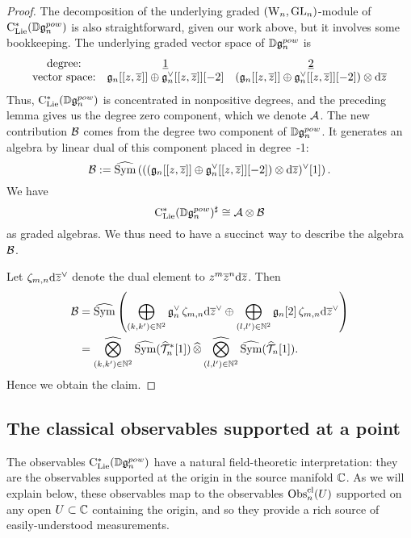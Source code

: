 \begin{proof}
The decomposition of the underlying graded $({{\rm W}_n},{\rm GL}_n)$-module of ${\rm C}_{\rm Lie}^*(\mathbb D\mathfrak{g}_n^{pow})$ 
is also straightforward, given our work above, but it involves some bookkeeping.
The underlying graded vector space of $\mathbb D\mathfrak{g}_n^{pow}$ is
\[
\begin{array}{ccc}
\text{degree:} & \underline{1} & \underline{2} \\
\text{vector space:} & \mathfrak{g}_n[[z,\overline{z}]] \oplus \mathfrak{g}_n^\vee[[z,\overline{z}]][-2] & (\mathfrak{g}_n[[z,\overline{z}]] \oplus \mathfrak{g}_n^\vee[[z,\overline{z}]][-2]) \otimes {\rm d}\overline{z}
\end{array}
\]
Thus, ${\rm C}_{\rm Lie}^*(\mathbb D\mathfrak{g}_n^{pow})$ is concentrated in nonpositive degrees, 
and the preceding lemma gives us the degree zero component,
which we denote $\mathcal{A}$.
The new contribution $\mathcal B$ comes from the degree two component of $\mathbb D\mathfrak{g}_n^{pow}$.
It generates an algebra by linear dual of this component placed in degree~-1:
\[
\mathcal B := \widehat{{\rm Sym}}\left( ((\mathfrak{g}_n[[z,\overline{z}]] \oplus \mathfrak{g}_n^\vee[[z,\overline{z}]][-2]) \otimes {\rm d}\overline{z})^\vee[1] \right).
\]
We  have
\[
{\rm C}_{\rm Lie}^*(\mathbb D\mathfrak{g}_n^{pow})^\sharp \cong \mathcal{A} \otimes \mathcal B
\]
as graded algebras.
We thus need to have a succinct way to describe the algebra~$\mathcal B$.

Let $\zeta_{m,n} {\rm d} \overline{z}^\vee$ denote the dual element to $z^m \overline{z}^n {\rm d}\overline{z}$.
Then 
\begin{align*}
\mathcal B &= \widehat{{\rm Sym}} \left( \bigoplus_{(k,k') \in \mathbb N^2} \mathfrak{g}_n^\vee \, \zeta_{m,n} {\rm d} \overline{z}^\vee \oplus \bigoplus_{(l,l') \in \mathbb N^2} \mathfrak{g}_n[2] \, \zeta_{m,n} {\rm d} \overline{z}^\vee\right)\\
&= \underset{{(k,k') \in \mathbb N^2}}{\widehat{\bigotimes}}\,\widehat{{\rm Sym}}(\widehat{\mathcal T}_n^*[1])\, \widehat{\otimes}\, \underset{{(l,l') \in \mathbb N^2}}{\widehat{\bigotimes}}\,\widehat{{\rm Sym}}(\widehat{\mathcal T}_n[1]).
\end{align*}
Hence we obtain the claim.
\end{proof}

\subsection{The classical observables supported at a point}

The observables ${\rm C}_{\rm Lie}^*(\mathbb D\mathfrak{g}_n^{pow})$ have a natural field-theoretic interpretation:
they are the observables supported at the origin in the source manifold $\mathbb C$.
As we will explain below, these observables map to the observables ${\rm Obs}^{\rm cl}_n(U)$
supported on any open $U \subset \mathbb C$ containing the origin,
and so they provide a rich source of easily-understood measurements.

